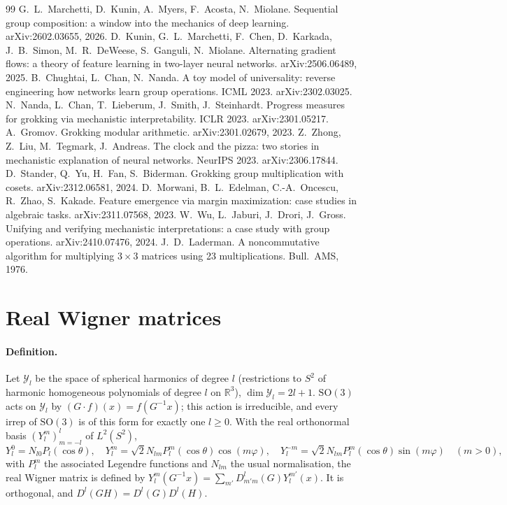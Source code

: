 \documentclass[a4paper,11pt]{article}
\theoremstyle{remark}
\theoremstyle{definition}
\newcommand{\R}{\mathbb{R}}
\newcommand{\SO}{\mathrm{SO}(3)}
\begin{document}
\begin{thebibliography}{99}
 G.~L.~Marchetti, D.~Kunin, A.~Myers, F.~Acosta,
  N.~Miolane. Sequential group composition: a window into the mechanics of deep
  learning. arXiv:2602.03655, 2026.
 D.~Kunin, G.~L.~Marchetti, F.~Chen, D.~Karkada, J.~B.~Simon,
  M.~R.~DeWeese, S.~Ganguli, N.~Miolane. Alternating gradient flows: a theory of
  feature learning in two-layer neural networks. arXiv:2506.06489, 2025.
 B.~Chughtai, L.~Chan, N.~Nanda. A toy model of
  universality: reverse engineering how networks learn group operations. ICML 2023. arXiv:2302.03025.
 N.~Nanda, L.~Chan, T.~Lieberum, J.~Smith,
  J.~Steinhardt. Progress measures for grokking via mechanistic
  interpretability. ICLR 2023. arXiv:2301.05217.
 A.~Gromov. Grokking modular arithmetic. arXiv:2301.02679, 2023.
 Z.~Zhong, Z.~Liu, M.~Tegmark, J.~Andreas. The clock
  and the pizza: two stories in mechanistic explanation of neural networks.
  NeurIPS 2023. arXiv:2306.17844.
 D.~Stander, Q.~Yu, H.~Fan, S.~Biderman. Grokking
  group multiplication with cosets. arXiv:2312.06581, 2024.
 D.~Morwani, B.~L.~Edelman, C.-A.~Oncescu, R.~Zhao,
  S.~Kakade. Feature emergence via margin maximization: case studies in
  algebraic tasks. arXiv:2311.07568, 2023.
 W.~Wu, L.~Jaburi, J.~Drori, J.~Gross. Unifying and verifying
  mechanistic interpretations: a case study with group operations.
  arXiv:2410.07476, 2024.
 J.~D.~Laderman. A noncommutative algorithm for
  multiplying $3\times3$ matrices using 23 multiplications. Bull.\ AMS, 1976.
\end{thebibliography}

\appendix
\section{Real Wigner matrices}\label{app:wigner}

\paragraph{Definition.} Let $\mathcal Y_l$ be the space of spherical harmonics of
degree $l$ (restrictions to $S^2$ of harmonic homogeneous polynomials of degree $l$
on $\R^3$), $\dim\mathcal Y_l=2l+1$. $\SO$ acts on $\mathcal Y_l$ by
$(G\cdot f)(x)=f(G^{-1}x)$; this action is irreducible, and every irrep of $\SO$ is
of this form for exactly one $l\ge0$. With the real orthonormal basis
$(Y_l^m)_{m=-l}^{l}$ of $L^2(S^2)$,
\[
Y_l^0=N_{l0}P_l(\cos\theta),\quad
Y_l^m=\sqrt2N_{lm}P_l^{m}(\cos\theta)\cos(m\varphi),\quad
Y_l^{-m}=\sqrt2N_{lm}P_l^{m}(\cos\theta)\sin(m\varphi)\quad(m>0),
\]
with $P_l^m$ the associated Legendre functions and $N_{lm}$ the usual normalisation,
the real Wigner matrix is defined by
$Y_l^m(G^{-1}x)=\sum_{m'}D^l_{m'm}(G)Y_l^{m'}(x)$. It is orthogonal, and
$D^l(GH)=D^l(G)D^l(H)$.
\end{document}
